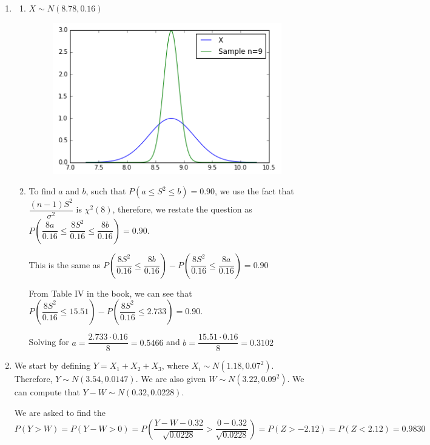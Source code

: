 \documentclass{article}
\newcommand\myskip[1]{\addtocounter{enumi}{#1}}
\begin{document}
\begin{enumerate}
      \newpage
      \item
	\begin{enumerate}
	 \item
	  $X \sim N(8.78,0.16)$
	  \begin{figure}[h!]
	    \centering
	    \includegraphics[scale=.7]{./images/5a_plotSampleDistribution.png}
	  \end{figure}
	 
	 \item
	  To find $a$ and $b$, such that $P(a \le S^2 \le b) = 0.90$, we use the fact that 
	  $\dfrac{(n-1)S^2}{\sigma^2}$ is $\chi^2(8)$, therefore, we restate the question as 
	  $P\left(\dfrac{8a}{0.16} \le \dfrac{8 S^2}{0.16} \le \dfrac{8b}{0.16}\right) = 0.90$.
	  
	  This is the same as $P\left(\dfrac{8 S^2}{0.16} \le \dfrac{8b}{0.16}\right) 
	    - P\left(\dfrac{8 S^2}{0.16} \le \dfrac{8a}{0.16}\right) = 0.90$
	    
	  From Table IV in the book, we can see that $P\left(\dfrac{8 S^2}{0.16} \le 15.51\right) 
	    - P\left(\dfrac{8 S^2}{0.16} \le 2.733\right) = 0.90$.
	    
	  Solving for $a = \dfrac{2.733 \cdot 0.16}{8} = 0.5466$ and 
	  $b = \dfrac{15.51 \cdot 0.16}{8} = 0.3102$	  
	\end{enumerate}
      \myskip{1}
      
      \item
	We start by defining $Y = X_1 + X_2 + X_3$, where $X_i \sim N(1.18, 0.07^2)$. Therefore,
	$Y \sim N(3.54, 0.0147)$. We are also given $W \sim N(3.22, 0.09^2)$. We can compute that
	$Y-W \sim N(0.32, 0.0228)$. 
	
	We are asked to find the $P(Y > W) = P(Y-W > 0) 
	  = P\left(\dfrac{Y-W - 0.32}{\sqrt{0.0228}} > \dfrac{0-0.32}{\sqrt{0.0228}}\right)
	  = P(Z > -2.12) = P(Z < 2.12) = 0.9830$
      

\end{enumerate}
\end{document}
